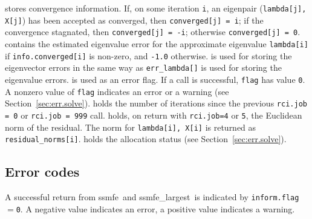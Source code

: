 \begin{description}
%
 stores convergence information.
If, on some iteration {\tt i}, an eigenpair ({\tt lambda[j], X[j]})
has been accepted as converged, then {\tt converged[j] = i}; 
if the convergence stagnated, then {\tt converged[j] = -i}; 
otherwise {\tt converged[j] = 0}.
%
 contains 
the estimated eigenvalue error
for the approximate eigenvalue {\tt lambda[i]}
if {\tt info.converged[i]} is non-zero,
and {\tt -1.0} otherwise.
%
 is used for storing the eigenvector errors
in the same way as {\tt err\_lambda[]} is used
for storing the eigenvalue errors.
%
 is used as an error flag.
If a call is successful, {\tt flag} has value {\tt 0}.
A nonzero value of {\tt flag} indicates an error or a warning
(see Section~\ref{sec:err.solve}).
%
 holds the number of iterations 
since the previous {\tt rci.job = 0} or {\tt rci.job = 999} call.
%
 holds, on return with
{\tt rci.job=4} or {\tt 5}, 
the Euclidean norm of the residual. The norm
for {\tt lambda[i], X[i]} is returned as \texttt{residual\_norms[i]}.
%
holds the allocation status
(see Section~\ref{sec:err.solve}).
%
\end{description}

\subsection{Error codes}

\label{sec:err}

A successful return from 
ssmfe\ and
ssmfe\_largest\
is indicated 
by {\tt inform.flag$=$0}.
A negative value indicates an error, a positive value indicates a warning.

\label{sec:err.solve}

